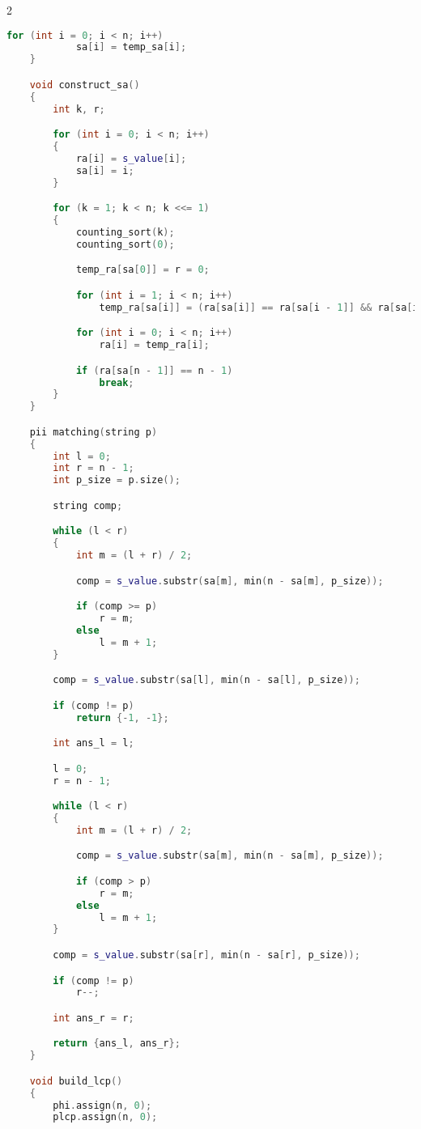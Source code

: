 \documentclass[leter]{amsart}
\begin{document}
\begin{multicols}{2}
\begin{lstlisting}[language=C++]
        for (int i = 0; i < n; i++)
            sa[i] = temp_sa[i];
    }

    void construct_sa()
    {
        int k, r;

        for (int i = 0; i < n; i++)
        {
            ra[i] = s_value[i];
            sa[i] = i;
        }

        for (k = 1; k < n; k <<= 1)
        {
            counting_sort(k);
            counting_sort(0);

            temp_ra[sa[0]] = r = 0;

            for (int i = 1; i < n; i++)
                temp_ra[sa[i]] = (ra[sa[i]] == ra[sa[i - 1]] && ra[sa[i] + k] == ra[sa[i - 1] + k]) ? r : ++r;

            for (int i = 0; i < n; i++)
                ra[i] = temp_ra[i];

            if (ra[sa[n - 1]] == n - 1)
                break;
        }
    }

    pii matching(string p)
    {
        int l = 0;
        int r = n - 1;
        int p_size = p.size();

        string comp;

        while (l < r)
        {
            int m = (l + r) / 2;

            comp = s_value.substr(sa[m], min(n - sa[m], p_size));

            if (comp >= p)
                r = m;
            else
                l = m + 1;
        }

        comp = s_value.substr(sa[l], min(n - sa[l], p_size));

        if (comp != p)
            return {-1, -1};

        int ans_l = l;

        l = 0;
        r = n - 1;

        while (l < r)
        {
            int m = (l + r) / 2;

            comp = s_value.substr(sa[m], min(n - sa[m], p_size));

            if (comp > p)
                r = m;
            else
                l = m + 1;
        }

        comp = s_value.substr(sa[r], min(n - sa[r], p_size));

        if (comp != p)
            r--;

        int ans_r = r;

        return {ans_l, ans_r};
    }

    void build_lcp()
    {
        phi.assign(n, 0);
        plcp.assign(n, 0);


\end{lstlisting}
\end{multicols}
\end{document}
